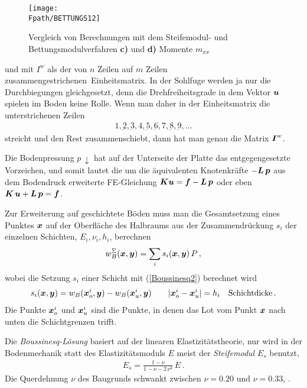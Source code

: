 \begin{figure}[tbp]
\centering
\if {} \sidecaption \fi
\texttt{[image: \\Fpath/BETTUNGS12]}
\caption{Vergleich von Berechnungen mit dem Steifemodul- und Bettungsmodulverfahren {\bf c)} und {\bf d)}
Momente $m_{xx}$}
\label{BettungS12}
\end{figure}%
und mit $I^w$ als der von $n$ Zeilen auf $m$ Zeilen \glq zusammengestrichenen\grq\ Einheitsmatrix. In der Sohlfuge werden ja nur die Durchbiegungen gleichgesetzt, denn die Drehfreiheitsgrade in dem Vektor $\mbox{\boldmath $u$}$ spielen im Boden keine Rolle. Wenn man daher in der Einheitsmatrix die unterstrichenen Zeilen
\begin{align}
1,
\underbar{2},\underbar{3},4,\underbar{5},\underbar{6},7,\underbar{8},\underbar{9},\ldots
\end{align}
streicht und den Rest zusammenschiebt, dann hat man genau die Matrix $\mbox{\boldmath $I$}^w$.

Die Bodenpressung $p \,\downarrow$ hat auf der Unterseite der Platte das entgegengesetzte Vorzeichen, und somit lautet die um die \"{a}quivalenten Knotenkr\"{a}fte $-\mbox{\boldmath $L$}\,\mbox{\boldmath $p$}$ aus dem Bodendruck erweiterte FE-Gleichung $\mbox{\boldmath $K$}\mbox{\boldmath $u$} = \mbox{\boldmath $f$} - \mbox{\boldmath $L$}\,\mbox{\boldmath $p$}$ oder eben $\mbox{\boldmath $K$} \,\mbox{\boldmath $u$} + \mbox{\boldmath $L$} \,\mbox{\boldmath $p$} = \mbox{\boldmath $f$}$.

Zur Erweiterung auf geschichtete B\"{o}den muss man die Gesamtsetzung eines Punktes $\mbox{\boldmath $x$}$ auf der Oberfl\"{a}che des Halbraums aus der Zusammendr\"{u}ckung $s_i$ der einzelnen Schichten, $E_i,\nu_i,h_i$, berechnen
\begin{align}
w_B^\Sigma(\mbox{\boldmath $x$},\mbox{\boldmath $y$}) = \sum_i s_i(\mbox{\boldmath $x$},\mbox{\boldmath $y$}) \,P\,,
\end{align}
wobei die Setzung $s_i$ einer Schicht mit (\ref{Boussinesq2}) berechnet wird
\begin{align}
s_i(\mbox{\boldmath $x$},\mbox{\boldmath $y$}) = w_B(\mbox{\boldmath $x$}_o^i,\mbox{\boldmath $y$}) - w_B(\mbox{\boldmath $x$}_u^i,\mbox{\boldmath $y$}) \qquad |\mbox{\boldmath $x$}_o^i
- \mbox{\boldmath $x$}_u^i| = h_i \quad \mbox{Schichtdicke}\,.
\end{align}
Die Punkte $\mbox{\boldmath $x$}_o^i$ und $\mbox{\boldmath $x$}_u^i$ sind die Punkte, in denen das Lot vom Punkt $\mbox{\boldmath $x$}$ nach unten die Schichtgrenzen trifft.

Die {\em Boussinesq-L\"{o}sung\/} basiert auf der linearen Elastizit\"{a}tstheorie, nur wird in der Bodenmechanik statt des Elastizit\"{a}tsmoduls $E$ meist der {\em Steifemodul\/} $E_s$ benutzt,
\begin{align}
E_s = \frac{1-\nu}{1 - \nu -2\,\nu^2}\,E\,.
\end{align}
Die Querdehnung $\nu$ des Baugrunds schwankt zwischen $\nu = 0.20$ und $\nu = 0.33$,
\cite{Kany}.

